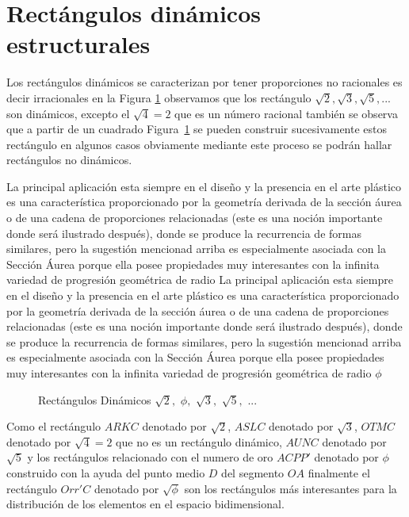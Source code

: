 \section{Rectángulos dinámicos estructurales}


Los rectángulos dinámicos se caracterizan por  tener proporciones no racionales es decir irracionales en la Figura \ref{dynamics} observamos que los rectángulo $\sqrt{2},\sqrt{3}, \sqrt{5},$... son dinámicos, excepto el $\sqrt{4}=2$ que es un número racional también se observa que a partir de un cuadrado Figura~\ref{dynamics} se pueden construir sucesivamente estos rectángulo en algunos  casos obviamente mediante este proceso se podrán hallar rectángulos  no dinámicos.

La principal aplicación esta siempre en el diseño y la presencia en el arte plástico es una característica proporcionado por la geometría derivada de la sección áurea o de una cadena de proporciones relacionadas (este es una noción importante donde será ilustrado después), donde se produce la recurrencia de formas similares, pero la sugestión mencionad arriba es especialmente asociada con la Sección Áurea porque ella posee propiedades muy interesantes con la infinita variedad de progresión geométrica de radio
La principal aplicación esta siempre en el diseño y la presencia en el arte plástico es una característica proporcionado por la geometría derivada de la sección áurea o de una cadena de proporciones relacionadas (este es una noción importante donde será ilustrado después), donde se produce la recurrencia de formas similares, pero la sugestión mencionad arriba es especialmente asociada con la Sección Áurea porque ella posee propiedades muy interesantes con la infinita variedad de progresión geométrica de radio $\phi$


\begin{figure}[!ht]
	\begin{center}

	\end{center}
	\caption{Rectángulos Dinámicos $\sqrt{2},$ $\phi,$ $\sqrt{3},$ $\sqrt{5},$ ...}
	\label{dynamics}
\end{figure}

Como el rectángulo $ARKC$ denotado por $\sqrt{2}$, $ASLC$ denotado por $\sqrt{3}$, $OTMC$ denotado por $\sqrt{4}=2$ que no es un rectángulo dinámico, $AUNC$ denotado por $\sqrt{5}$ y los rectángulos relacionado con el numero de oro $ACPP'$ denotado por $\phi$ construido con la ayuda del punto medio $D$ del segmento $OA$ finalmente el rectángulo $Orr'C$ denotado por $\sqrt{\phi}$ son los rectángulos más interesantes para la distribución de los elementos en el espacio bidimensional.



